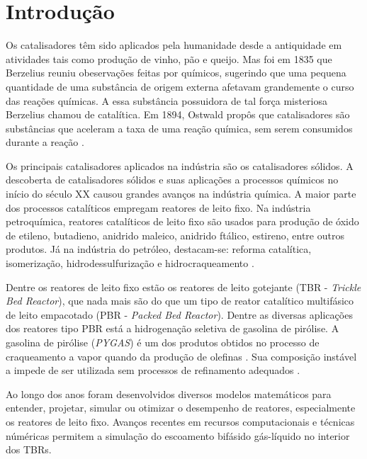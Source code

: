 %
% 
%
\chapter{Introdução} \label{chap:introducao}

Os catalisadores têm sido aplicados pela humanidade desde a antiquidade
em atividades tais como produção de vinho, pão e queijo. Mas foi em 1835 que
Berzelius reuniu obeservações feitas por químicos, sugerindo que uma pequena
quantidade de uma substância de origem externa afetavam grandemente o curso das
reações químicas. A essa substância possuidora de tal força misteriosa Berzelius
chamou de catalítica. Em 1894, Ostwald propôs que catalisadores são
substâncias que aceleram a taxa de uma reação química, sem serem consumidos
durante a reação \cite{Oyama1988}.

Os principais catalisadores aplicados na indústria são os catalisadores
sólidos. A descoberta de catalisadores sólidos e suas aplicações a processos
químicos no início do século XX causou grandes avanços na indústria química. A
maior parte dos processos catalíticos empregam reatores de leito fixo. Na
indústria petroquímica, reatores catalíticos de leito fixo são usados para
produção de óxido de etileno, butadieno, anidrido maleico, anidrido ftálico,
estireno, entre outros produtos. Já na indústria do petróleo, destacam-se:
reforma catalítica, isomerização, hidrodessulfurização e hidrocraqueamento \cite{Froment2011}.

Dentre os reatores de leito fixo estão os reatores de leito gotejante
(TBR - \emph{Trickle Bed Reactor}), que nada mais são do que um tipo de reator
catalítico multifásico de leito empacotado (PBR - \emph{Packed Bed Reactor}).
Dentre as diversas aplicações dos reatores tipo PBR está a hidrogenação
seletiva de gasolina de pirólise. A gasolina de pirólise (\emph{PYGAS}) é um dos
produtos obtidos no processo de craqueamento a vapor quando da produção de
olefinas \cite{Cheng1986}. Sua composição instável a impede de ser utilizada sem
processos de refinamento adequados \cite{Derrien1986}.

Ao longo dos anos foram desenvolvidos diversos modelos matemáticos para
entender, projetar, simular ou otimizar o desempenho de reatores, especialmente
os reatores de leito fixo. Avanços recentes em recursos computacionais e
técnicas núméricas permitem a simulação do escoamento bifásido gás-líquido no
interior dos TBRs\cite{Ranade2011}.

